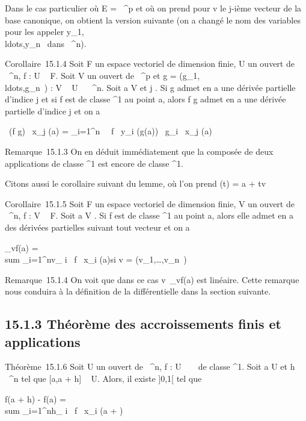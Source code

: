 \documentclass[]{article}
\begin{document}
Dans le cas particulier où E = ~^p et où on prend pour v le
j-ième vecteur de la base canonique, on obtient la version suivante (on
a changé le nom des variables pour les appeler
y_1,\\ldots,y_n~
dans ~^n).

Corollaire~15.1.4 Soit F un espace vectoriel de dimension finie, U un
ouvert de ~^n, f : U \rightarrow~ F. Soit V un ouvert de ~^p
et g =
(g_1,\\ldots,g_n~)
: V \rightarrow~ U \subset~ ~^n. Soit a \in V et j \in [1,p]. Si g admet en a
une dérivée partielle d'indice j et si f est de classe ^1 au
point a, alors f \cdot g admet en a une dérivée partielle d'indice j et on a

 \partial~(f \cdot g) \over \partial~x_j (a) =
\sum _i=1^n~ \partial~f
\over \partial~y_i (g(a)) \partial~g_i
\over \partial~x_j (a)

Remarque~15.1.3 On en déduit immédiatement que la composée de deux
applications de classe ^1 est encore de classe
^1.

Citons aussi le corollaire suivant du lemme, où l'on prend \phi(t) = a + tv

Corollaire~15.1.5 Soit F un espace vectoriel de dimension finie, V un
ouvert de ~^n, f : V \rightarrow~ F. Soit a \in V . Si f est de classe
^1 au point a, alors elle admet en a des dérivées partielles
suivant tout vecteur et on a

\partial_vf(a) = \\sum
_i=1^nv_ i \partial~f \over
\partial~x_i (a)\qquad \text si v =
(v_1,\ldots,v_n~)

Remarque~15.1.4 On voit que dans ce cas
v\mapsto~\partial_vf(a) est linéaire. Cette
remarque nous conduira à la définition de la différentielle dans la
section suivante.

\subsection{15.1.3 Théorème des accroissements finis et applications}

Théorème~15.1.6 Soit U un ouvert de ~^n, f : U \rightarrow~ ~ de classe
^1. Soit a \in U et h \in {}~^n tel que [a,a + h] \subset~
U. Alors, il existe \theta \in]0,1[ tel que

f(a + h) - f(a) = \\sum
_i=1^nh_ i \partial~f \over
\partial~x_i (a + \thetah)
\end{document}
